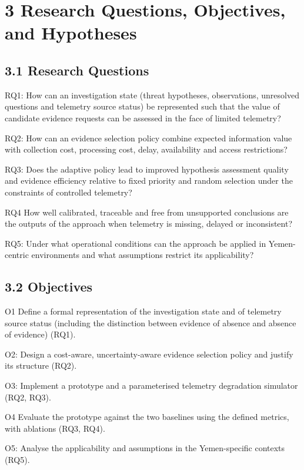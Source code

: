 \documentclass[a4paper,11pt]{article}
\begin{document}
\section{3 Research Questions, Objectives, and Hypotheses}
\subsection{3.1 Research Questions}
RQ1: How can an investigation state (threat hypotheses, observations, unresolved questions and telemetry source status) be represented such that the value of candidate evidence requests can be assessed in the face of limited telemetry?\par
RQ2: How can an evidence selection policy combine expected information value with collection cost, processing cost, delay, availability and access restrictions?\par
RQ3: Does the adaptive policy lead to improved hypothesis assessment quality and evidence efficiency relative to fixed priority and random selection under the constraints of controlled telemetry?\par
RQ4 How well calibrated, traceable and free from unsupported conclusions are the outputs of the approach when telemetry is missing, delayed or inconsistent?\par
RQ5: Under what operational conditions can the approach be applied in Yemen-centric environments and what assumptions restrict its applicability?\par
\subsection{3.2 Objectives}
O1 Define a formal representation of the investigation state and of telemetry source status (including the distinction between evidence of absence and absence of evidence) (RQ1).\par
O2: Design a cost-aware, uncertainty-aware evidence selection policy and justify its structure (RQ2).\par
O3: Implement a prototype and a parameterised telemetry degradation simulator (RQ2, RQ3).\par
O4 Evaluate the prototype against the two baselines using the defined metrics, with ablations (RQ3, RQ4).\par
O5: Analyse the applicability and assumptions in the Yemen-specific contexts (RQ5).\par
\end{document}
